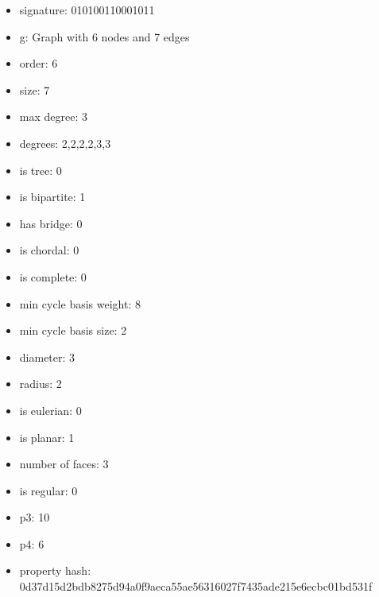 \begin{itemize}
\item signature: 010100110001011
\item g: Graph with 6 nodes and 7 edges
\item order: 6
\item size: 7
\item max degree: 3
\item degrees: 2,2,2,2,3,3
\item is tree: 0
\item is bipartite: 1
\item has bridge: 0
\item is chordal: 0
\item is complete: 0
\item min cycle basis weight: 8
\item min cycle basis size: 2
\item diameter: 3
\item radius: 2
\item is eulerian: 0
\item is planar: 1
\item number of faces: 3
\item is regular: 0
\item p3: 10
\item p4: 6
\item property hash: 0d37d15d2bdb8275d94a0f9aeca55ae56316027f7435ade215e6ecbc01bd531f
\end{itemize}
\newpage
\begin{figure}
\end{figure}
